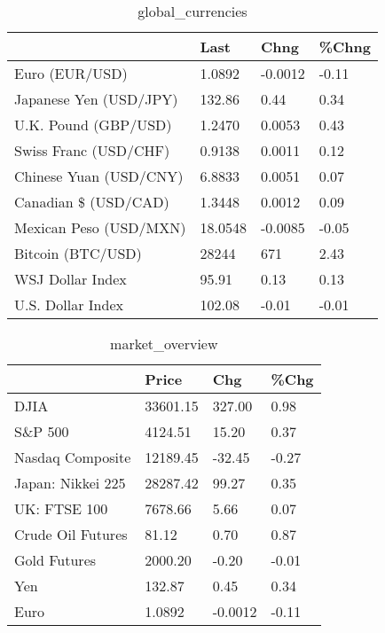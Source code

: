 \documentclass{article}%
\begin{document}
%


\begin{table}[htbp]%
\caption{global\_currencies}%
\centering%
\begin{adjustbox}{width=1\textwidth}%
\begin{tabular}{llll}
\toprule
                       &    Last &    Chng & \%Chng \\
\midrule
        Euro (EUR/USD) &  1.0892 & -0.0012 & -0.11 \\
Japanese Yen (USD/JPY) &  132.86 &    0.44 &  0.34 \\
  U.K. Pound (GBP/USD) &  1.2470 &  0.0053 &  0.43 \\
 Swiss Franc (USD/CHF) &  0.9138 &  0.0011 &  0.12 \\
Chinese Yuan (USD/CNY) &  6.8833 &  0.0051 &  0.07 \\
  Canadian \$ (USD/CAD) &  1.3448 &  0.0012 &  0.09 \\
Mexican Peso (USD/MXN) & 18.0548 & -0.0085 & -0.05 \\
     Bitcoin (BTC/USD) &   28244 &     671 &  2.43 \\
      WSJ Dollar Index &   95.91 &    0.13 &  0.13 \\
     U.S. Dollar Index &  102.08 &   -0.01 & -0.01 \\
\bottomrule
\end{tabular}
%
\end{adjustbox}%
\end{table}

%


\begin{table}[htbp]%
\caption{market\_overview}%
\centering%
\begin{adjustbox}{width=1\textwidth}%
\begin{tabular}{llll}
\toprule
                  &    Price &     Chg &  \%Chg \\
\midrule
             DJIA & 33601.15 &  327.00 &  0.98 \\
          S\&P 500 &  4124.51 &   15.20 &  0.37 \\
 Nasdaq Composite & 12189.45 &  -32.45 & -0.27 \\
Japan: Nikkei 225 & 28287.42 &   99.27 &  0.35 \\
     UK: FTSE 100 &  7678.66 &    5.66 &  0.07 \\
Crude Oil Futures &    81.12 &    0.70 &  0.87 \\
     Gold Futures &  2000.20 &   -0.20 & -0.01 \\
              Yen &   132.87 &    0.45 &  0.34 \\
             Euro &   1.0892 & -0.0012 & -0.11 \\
\bottomrule
\end{tabular}
%
\end{adjustbox}%
\end{table}

%
\end{document}
